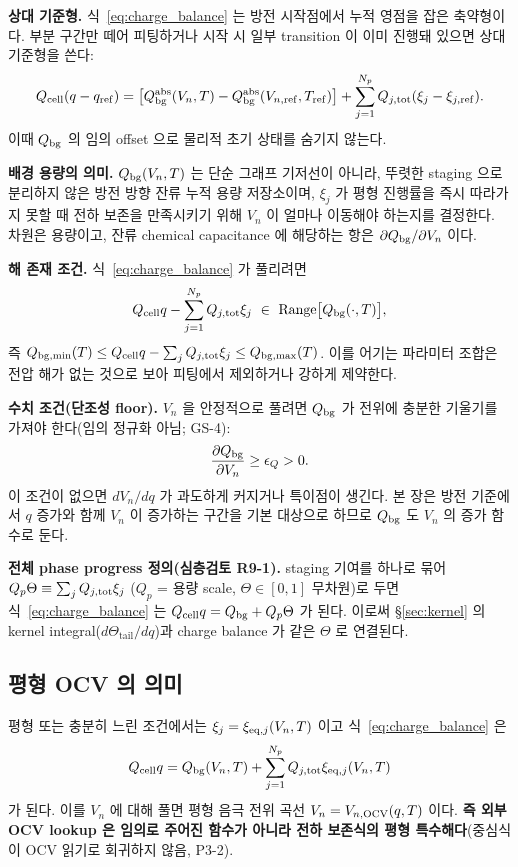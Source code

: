 \textbf{상대 기준형.} 식~\eqref{eq:charge_balance} 는 방전 시작점에서 누적 영점을 잡은 축약형이다.
부분 구간만 떼어 피팅하거나 시작 시 일부 transition 이 이미 진행돼 있으면 상대 기준형을 쓴다:
\begin{equation}
Q_{\mathrm{cell}}(q-q_\mathrm{ref})=\big[Q_{\mathrm{bg}}^\mathrm{abs}(V_n,T)-Q_{\mathrm{bg}}^\mathrm{abs}(V_{n,\mathrm{ref}},T_\mathrm{ref})\big]
+\sum_{j=1}^{N_p}Q_{j,\mathrm{tot}}(\xi_j-\xi_{j,\mathrm{ref}}).
\label{eq:charge_balance_rel}
\end{equation}
이때 $Q_{\mathrm{bg}}$ 의 임의 offset 으로 물리적 초기 상태를 숨기지 않는다.

\textbf{배경 용량의 의미.} $Q_{\mathrm{bg}}(V_n,T)$ 는 단순 그래프 기저선이 아니라, 뚜렷한 staging 으로 분리하지
않은 방전 방향 잔류 누적 용량 저장소이며, $\xi_j$ 가 평형 진행률을 즉시 따라가지 못할 때 전하 보존을
만족시키기 위해 $V_n$ 이 얼마나 이동해야 하는지를 결정한다. 차원은 용량이고, 잔류 chemical
capacitance 에 해당하는 항은 $\partial Q_{\mathrm{bg}}/\partial V_n$ 이다.

\textbf{해 존재 조건.} 식~\eqref{eq:charge_balance} 가 풀리려면
\begin{equation}
Q_\cell q-\sum_{j=1}^{N_p}Q_{j,\tot}\xi_j\ \in\ \mathrm{Range}\big[Q_\bg(\cdot,T)\big],
\label{eq:solexist}
\end{equation}
즉 $Q_{\mathrm{bg},\min}(T)\le Q_{\mathrm{cell}} q-\sum_j Q_{j,\mathrm{tot}}\xi_j\le Q_{\mathrm{bg},\max}(T)$. 이를 어기는 파라미터
조합은 전압 해가 없는 것으로 보아 피팅에서 제외하거나 강하게 제약한다.

\textbf{수치 조건(단조성 floor).} $V_n$ 을 안정적으로 풀려면 $Q_{\mathrm{bg}}$ 가 전위에 충분한 기울기를 가져야
한다(임의 정규화 아님; GS-4):
\begin{equation}
\frac{\partial Q_{\mathrm{bg}}}{\partial V_n}\ge \epsilon_Q>0.
\label{eq:monotone}
\end{equation}
이 조건이 없으면 $dV_n/dq$ 가 과도하게 커지거나 특이점이 생긴다. 본 장은 방전 기준에서 $q$ 증가와
함께 $V_n$ 이 증가하는 구간을 기본 대상으로 하므로 $Q_{\mathrm{bg}}$ 도 $V_n$ 의 증가 함수로 둔다.

\textbf{전체 phase progress 정의(심층검토 R9-1).} staging 기여를 하나로 묶어
$Q_p\Theta\equiv\sum_j Q_{j,\mathrm{tot}}\xi_j$ ($Q_p$ = 용량 scale, $\Theta\in[0,1]$ 무차원)로 두면
식~\eqref{eq:charge_balance} 는 $Q_{\mathrm{cell}} q=Q_{\mathrm{bg}}+Q_p\Theta$ 가 된다. 이로써 \S\ref{sec:kernel} 의
kernel integral($d\Theta_\mathrm{tail}/dq$)과 charge balance 가 같은 $\Theta$ 로 연결된다.

\subsection{평형 OCV 의 의미}\label{sec:ocv}
평형 또는 충분히 느린 조건에서는 $\xi_j=\xi_{\mathrm{eq},j}(V_n,T)$ 이고 식~\eqref{eq:charge_balance} 은
\begin{equation}
Q_{\mathrm{cell}} q=Q_{\mathrm{bg}}(V_n,T)+\sum_{j=1}^{N_p}Q_{j,\mathrm{tot}}\xi_{\mathrm{eq},j}(V_n,T)
\label{eq:ocv_implicit}
\end{equation}
가 된다. 이를 $V_n$ 에 대해 풀면 평형 음극 전위 곡선 $V_n=V_{n,\mathrm{OCV}}(q,T)$ 이다. \textbf{즉 외부 OCV
lookup 은 임의로 주어진 함수가 아니라 전하 보존식의 평형 특수해다}(중심식이 OCV 읽기로 회귀하지 않음, P3-2).

